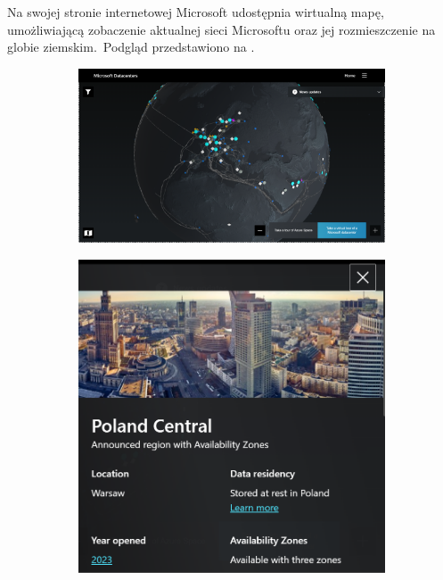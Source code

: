 Na swojej stronie internetowej Microsoft udostępnia wirtualną mapę, umożliwiającą zobaczenie aktualnej sieci Microsoftu oraz jej rozmieszczenie na globie ziemskim.\ Podgląd przedstawiono na .

\begin{figure}[H]
    \begin{subfigure}[m]{0.7\textwidth}
    \includegraphics[width=\textwidth]{images/azure-ic}
    \end{subfigure}
    \hfill
    \begin{subfigure}[m]{0.25\textwidth}
        \includegraphics[width=\textwidth]{images/azure-pl}
    \end{subfigure}
    \label{fig:azure-ic}
\end{figure}

